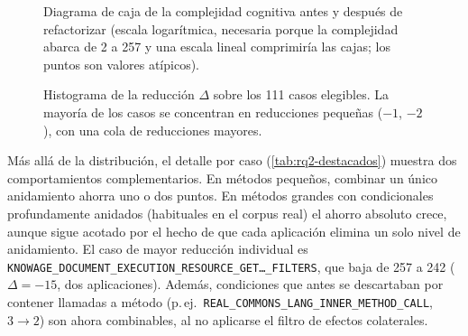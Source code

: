 \begin{figure}[ht]
\centering
{}
\caption{Diagrama de caja de la complejidad cognitiva antes y después de
refactorizar (escala logarítmica, necesaria porque la complejidad abarca de 2
a 257 y una escala lineal comprimiría las cajas; los puntos son valores
atípicos).}
\label{fig:boxplots}
\end{figure}

\begin{figure}[ht]
\centering
{}
\caption{Histograma de la reducción $\Delta$ sobre los 111 casos elegibles. La mayoría de los casos se concentran en reducciones pequeñas ($-1$, $-2$), con una
cola de reducciones mayores.}
\label{fig:hist-delta}
\end{figure}

Más allá de la distribución, el detalle por caso
(\autoref{tab:rq2-destacados}) muestra dos comportamientos complementarios. En
métodos pequeños, combinar un único anidamiento ahorra uno o dos puntos. En
métodos grandes con condicionales profundamente anidados (habituales en el
corpus real) el ahorro absoluto crece, aunque sigue acotado por el hecho de que
cada aplicación elimina un solo nivel de anidamiento. El caso de mayor reducción
individual es
\texttt{KNOWAGE\_DOCUMENT\_EXECUTION\_RESOURCE\_GET\dots\_FILTERS}, que baja de
257 a 242 ($\Delta=-15$, dos aplicaciones). Además, condiciones que antes se
descartaban por contener llamadas a método (p.\,ej.\
\texttt{REAL\_COMMONS\_LANG\_INNER\_METHOD\_CALL}, $3\rightarrow2$) son ahora
combinables, al no aplicarse el filtro de efectos colaterales.

